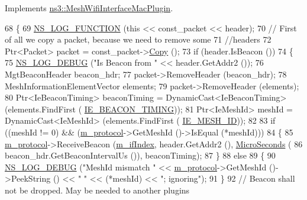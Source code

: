Implements \hyperlink{classns3_1_1MeshWifiInterfaceMacPlugin_a36279337239f8cbdb31162221e192236}{ns3\+::\+Mesh\+Wifi\+Interface\+Mac\+Plugin}.


\begin{DoxyCode}
68 \{
69   \hyperlink{log-macros-disabled_8h_a90b90d5bad1f39cb1b64923ea94c0761}{NS\_LOG\_FUNCTION} (\textcolor{keyword}{this} << const\_packet << header);
70   \textcolor{comment}{// First of all we copy a packet, because we need to remove some}
71   \textcolor{comment}{//headers}
72   Ptr<Packet> packet = const\_packet->\hyperlink{classns3_1_1Packet_a5d5c70802a5f77fc5f0001e0cfc1898b}{Copy} ();
73   \textcolor{keywordflow}{if} (header.IsBeacon ())
74     \{
75       \hyperlink{group__logging_ga413f1886406d49f59a6a0a89b77b4d0a}{NS\_LOG\_DEBUG} (\textcolor{stringliteral}{"Is Beacon from "} << header.GetAddr2 ());
76       MgtBeaconHeader beacon\_hdr;
77       packet->RemoveHeader (beacon\_hdr);
78       MeshInformationElementVector elements;
79       packet->RemoveHeader (elements);
80       Ptr<IeBeaconTiming> beaconTiming = DynamicCast<IeBeaconTiming> (elements.FindFirst (
      \hyperlink{wifi-information-element_8h_a69575a38a31ff7556fa0f2e74aaf6dc7}{IE\_BEACON\_TIMING}));
81       Ptr<IeMeshId> meshId = DynamicCast<IeMeshId> (elements.FindFirst (
      \hyperlink{wifi-information-element_8h_ae2847c76aa4afaa18011e77c32a7a752}{IE\_MESH\_ID}));
82 
83       \textcolor{keywordflow}{if} ((meshId != 0) && (\hyperlink{classns3_1_1dot11s_1_1PeerManagementProtocolMac_afbdd1f31cd54c320267ffb3426559095}{m\_protocol}->GetMeshId ()->IsEqual (*meshId)))
84         \{
85           \hyperlink{classns3_1_1dot11s_1_1PeerManagementProtocolMac_afbdd1f31cd54c320267ffb3426559095}{m\_protocol}->ReceiveBeacon (\hyperlink{classns3_1_1dot11s_1_1PeerManagementProtocolMac_a6127e7b929975cae23d8ef639e254991}{m\_ifIndex}, header.GetAddr2 (), 
      \hyperlink{group__timecivil_ga17465a639c8d1464e76538afdd78a9f0}{MicroSeconds} (
86                                        beacon\_hdr.GetBeaconIntervalUs ()), beaconTiming);
87         \}
88       \textcolor{keywordflow}{else}
89         \{
90           \hyperlink{group__logging_ga413f1886406d49f59a6a0a89b77b4d0a}{NS\_LOG\_DEBUG} (\textcolor{stringliteral}{"MeshId mismatch "} << \hyperlink{classns3_1_1dot11s_1_1PeerManagementProtocolMac_afbdd1f31cd54c320267ffb3426559095}{m\_protocol}->GetMeshId ()->PeekString ()
       << \textcolor{stringliteral}{" "} << (*meshId) << \textcolor{stringliteral}{"; ignoring"});
91         \}
92       \textcolor{comment}{// Beacon shall not be dropped. May be needed to another plugins}

\end{DoxyCode}
